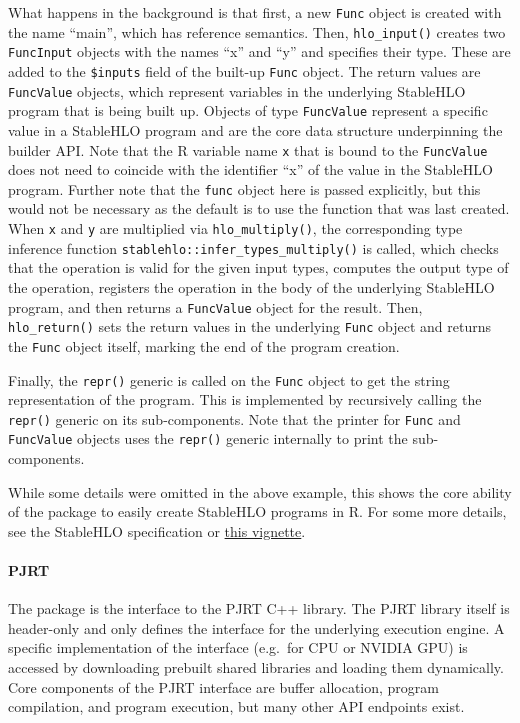 What happens in the background is that first, a new \texttt{Func} object is created with the name ``main'', which has reference semantics.
Then, \texttt{hlo\_input()} creates two \texttt{FuncInput} objects with the names ``x'' and ``y'' and specifies their type.
These are added to the \texttt{\$inputs} field of the built-up \texttt{Func} object.
The return values are \texttt{FuncValue} objects, which represent variables in the underlying StableHLO program that is being built up.
Objects of type \texttt{FuncValue} represent a specific value in a StableHLO program and are the core data structure underpinning the builder API.
Note that the R variable name \texttt{x} that is bound to the \texttt{FuncValue} does not need to coincide with the identifier ``x'' of the value in the StableHLO program.
Further note that the \texttt{func} object here is passed explicitly, but this would not be necessary as the default is to use the function that was last created.
When \texttt{x} and \texttt{y} are multiplied via \texttt{hlo\_multiply()}, the corresponding type inference function \texttt{stablehlo::infer\_types\_multiply()} is called, which checks that the operation is valid for the given input types, computes the output type of the operation, registers the operation in the body of the underlying StableHLO program, and then
returns a \texttt{FuncValue} object for the result.
Then, \texttt{hlo\_return()} sets the return values in the underlying \texttt{Func} object and returns the \texttt{Func} object itself, marking the end of the program creation.

Finally, the \texttt{repr()} generic is called on the \texttt{Func} object to get the string representation of the program.
This is implemented by recursively calling the \texttt{repr()} generic on its sub-components.
Note that the printer for \texttt{Func} and \texttt{FuncValue} objects uses the \texttt{repr()} generic internally to print the sub-components.

While some details were omitted in the above example, this shows the core ability of the  package to easily create StableHLO programs in R.
For some more details, see the StableHLO specification or \href{https://r-xla.github.io/stablehlo/articles/stablehlo.html}{this vignette}.

\paragraph{PJRT}\label{pjrt}

The  package is the interface to the PJRT C++ library.
The PJRT library itself is header-only and only defines the interface for the underlying execution engine.
A specific implementation of the interface (e.g.~for CPU or NVIDIA GPU) is accessed by downloading prebuilt shared libraries and loading them dynamically.
Core components of the PJRT interface are buffer allocation, program compilation, and program execution, but many other API endpoints exist.

